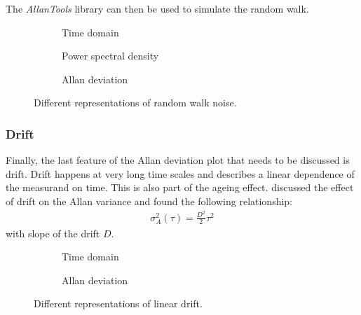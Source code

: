 The \textit{AllanTools} library \cite{allantools} can then be used to simulate the random walk.
\begin{figure}[ht]
    \centering
    \begin{subfigure}{0.32\linewidth}
        \centering
        \scalebox{0.75}{%
        } %
        \caption{Time domain}
        \label{fig:random_walk_time}
    \end{subfigure}
    \begin{subfigure}{0.32\linewidth}
        \centering
        \scalebox{0.75}{%
        } %
        \caption{Power spectral density}
        \label{fig:random_walk_psd}
    \end{subfigure}
    \begin{subfigure}{0.32\linewidth}
        \centering
        \scalebox{0.75}{%
        } %
        \caption{Allan deviation}
        \label{fig:random_walk_adev}
    \end{subfigure}
    \caption{Different representations of random walk noise.}
    \label{fig:random_walk_noise_simulated}
\end{figure}


\clearpage
\subsubsection{Drift}
Finally, the last feature of the Allan deviation plot that needs to be discussed is drift. Drift happens at very long time scales and describes a linear dependence of the measurand on time. This is also part of the ageing effect. \citeauthor{adev_drift} discussed the effect of drift \cite{adev_drift} on the Allan variance and found the following relationship:
\begin{align}
    \sigma_A^2(\tau) = \frac{D^2}{2} \tau^2
\end{align}
with slope of the drift $D$.
\begin{figure}[ht]
    \centering
    \begin{subfigure}{0.32\linewidth}
        \centering
        \scalebox{0.75}{%
        } %
        \caption{Time domain}
        \label{fig:drift_time}
    \end{subfigure}
    \begin{subfigure}{0.32\linewidth}
        \centering
        \scalebox{0.75}{%
        } %
        \caption{Allan deviation}
        \label{fig:drift_adev}
    \end{subfigure}
    \caption{Different representations of linear drift.}
    \label{fig:drift_noise_simulated}
\end{figure}

